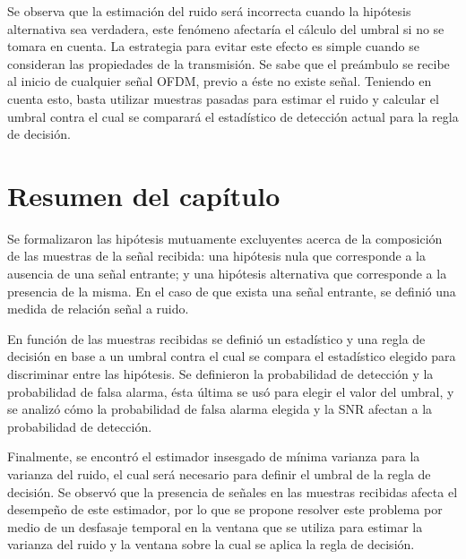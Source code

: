 Se observa que la estimación del ruido será incorrecta cuando la hipótesis alternativa sea verdadera, este fenómeno afectaría el cálculo del umbral si no se tomara en cuenta. La estrategia para evitar este efecto es simple cuando se consideran las propiedades de la transmisión. Se sabe que el preámbulo se recibe al inicio de cualquier señal OFDM, previo a éste no existe señal. Teniendo en cuenta esto, basta utilizar muestras pasadas para estimar el ruido y calcular el umbral contra el cual se comparará el estadístico de detección actual para la regla de decisión.

\section{Resumen del capítulo}

Se formalizaron las hipótesis mutuamente excluyentes acerca de la composición de las muestras de la señal recibida: una hipótesis nula que corresponde a la ausencia de una señal entrante; y una hipótesis alternativa que corresponde a la presencia de la misma. En el caso de que exista una señal entrante, se definió una medida de relación señal a ruido.  

En función de las muestras recibidas se definió un estadístico y una regla de decisión en base a un umbral contra el cual se compara el estadístico elegido para discriminar entre las hipótesis. Se definieron la probabilidad de detección y la probabilidad de falsa alarma, ésta última se usó para elegir el valor del umbral, y se analizó cómo la probabilidad de falsa alarma elegida y la SNR afectan a la probabilidad de detección. 

Finalmente, se encontró el estimador insesgado de mínima varianza para la varianza del ruido, el cual será necesario para definir el umbral de la regla de decisión. Se observó que la presencia de señales en las muestras recibidas afecta el desempeño de este estimador, por lo que se propone resolver este problema por medio de un desfasaje temporal en la ventana que se utiliza para estimar la varianza del ruido y la ventana sobre la cual se aplica la regla de decisión.